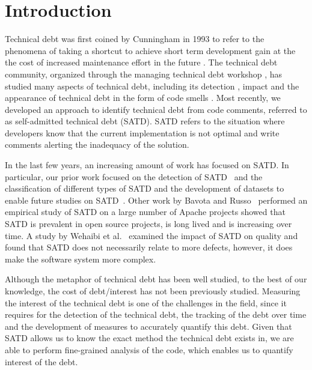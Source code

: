 \section{Introduction}
Technical debt was first coined by Cunningham in 1993 to refer to the phenomena of taking a shortcut to achieve short term development gain at the the cost of increased maintenance effort in the future \cite{Cunningham1992WPM}. The technical debt community, organized through the managing technical debt workshop \cite{MTD2016}, has studied many aspects of technical debt, including its detection \cite{Zazworka2013CSE}, impact \cite{Zazworka2011MTD} and the appearance of technical debt in the form of code smells \cite{Fontana2012MTD}. Most recently, we developed an approach to identify technical debt from code comments, referred to as self-admitted technical debt (SATD). SATD refers to the situation where developers know that the current implementation is not optimal and write comments alerting the inadequacy of the solution. 

In the last few years, an increasing amount of work has focused on SATD. In particular, our prior work focused on the detection of SATD~\cite{Potdar2014ICSME} and the classification of different types of SATD and the development of datasets to enable future studies on SATD~\cite{Maldonado2015MTD}. Other work by Bavota and Russo~\cite{Bavota2016MSR} performed an empirical study of SATD on a large number of Apache projects showed that SATD is prevalent in open source projects, is long lived and is increasing over time. A study by Wehaibi et al.~\cite{Wehaibi2016SANER} examined the impact of SATD on quality and found that SATD does not necessarily relate to more defects, however, it does make the software system more complex. 

Although the metaphor of technical debt has been well studied, to the best of our knowledge, the cost of debt/interest has not been previously studied. Measuring the interest of the technical debt is one of the challenges in the field, since it requires for the detection of the technical debt, the tracking of the debt over time and the development of measures to accurately quantify this debt. Given that SATD allows us to know the exact method the technical debt exists in, we are able to perform fine-grained analysis of the code, which enables us to quantify interest of the debt.

